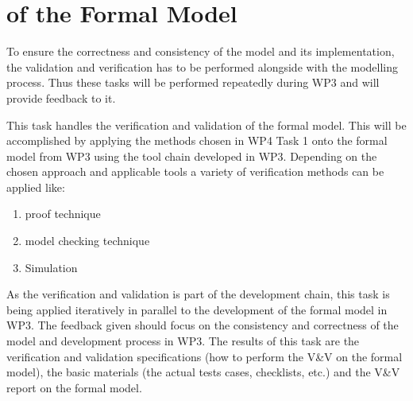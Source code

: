 \section{\VV of the Formal Model}
\tbc
To ensure the correctness and consistency of the model and its implementation, the validation and verification has to be performed alongside with the modelling process. Thus these tasks will be performed repeatedly during WP3 and will provide feedback to it.

This task handles the verification and validation of the formal model. This will be accomplished by applying the methods chosen in WP4 Task 1 onto the formal model from WP3 using the tool chain developed in WP3. Depending on the chosen approach and applicable tools a variety of verification methods can be applied like:
\begin{enumerate}
\item proof technique
\item model checking technique
\item Simulation
\end{enumerate}
As the verification and validation is part of the development chain, this task is being applied iteratively in parallel to the development of the formal model in WP3. The feedback given should focus on the consistency and correctness of the model and development process in WP3.
The results of this task are the verification and validation specifications (how to perform the V\&V on the formal model), the basic materials (the actual tests cases, checklists, etc.) and the V\&V report on the formal model.




